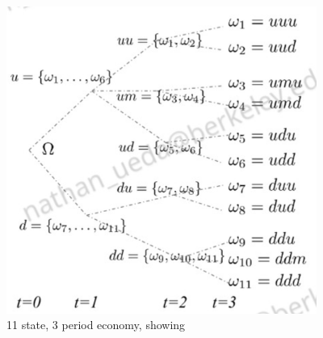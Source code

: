 \documentclass[11pt]{article}
\begin{document}
\begin{itemize}
    \begin{figure}[H] 
        \centering 
        \includegraphics[width=4in]{imgs/three_period_economy_2.png}
        \caption{11 state, 3 period economy, showing }
    \end{figure}


\end{itemize}
\end{document}
